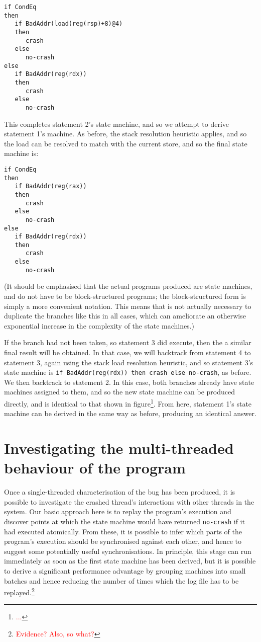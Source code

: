 \documentclass[10pt,twocolumn,preprint,natbib,authoryear]{sigplanconf}
\newcommand{\editorial}[1]{\textcolor{red}{\footnote{\textcolor{red}{#1}}}}
\begin{document}
\begin{verbatim}
if CondEq
then
   if BadAddr(load(reg(rsp)+8)@4)
   then
      crash
   else
      no-crash
else
   if BadAddr(reg(rdx))
   then
      crash
   else
      no-crash
\end{verbatim}

This completes statement 2's state machine, and so we attempt to
derive statement 1's machine.  As before, the stack resolution
heuristic applies, and so the load can be resolved to match with
the current store, and so the final state machine is:

\begin{verbatim}
if CondEq
then
   if BadAddr(reg(rax))
   then
      crash
   else
      no-crash
else
   if BadAddr(reg(rdx))
   then
      crash
   else
      no-crash
\end{verbatim}

(It should be emphasised that the actual programs produced are state
machines, and do not have to be block-structured programs; the
block-structured form is simply a more convenient notation.  This
means that is not actually necessary to duplicate the branches like
this in all cases, which can ameliorate an otherwise exponential
increase in the complexity of the state machines.)

If the branch had not been taken, so statement 3 did execute, then the
a similar final result will be obtained.  In that case, we will
backtrack from statement 4 to statement 3, again using the stack load
resolution heuristic, and so statement 3's state machine is
\verb|if BadAddr(reg(rdx)) then crash else no-crash|, as before.  We
then backtrack to statement 2.  In this case, both branches already
have state machines assigned to them, and so the new state machine can
be produced directly, and is identical to that shown in
figure\editorial{...}.  From here, statement 1's state machine can be
derived in the same way as before, producing an identical answer.

\section{Investigating the multi-threaded behaviour of the program}

Once a single-threaded characterisation of the bug has been produced,
it is possible to investigate the crashed thread's interactions with
other threads in the system.  Our basic approach here is to replay the
program's execution and discover points at which the state machine
would have returned \verb|no-crash| if it had executed atomically.
From these, it is possible to infer which parts of the program's
execution should be synchronised against each other, and hence to
suggest some potentially useful synchronisations.  In principle, this
stage can run immediately as soon as the first state machine has been
derived, but it is possible to derive a significant performance
advantage by grouping machines into small batches and hence reducing
the number of times which the log file has to be
replayed.\editorial{Evidence?  Also, so what?}
\end{document}

